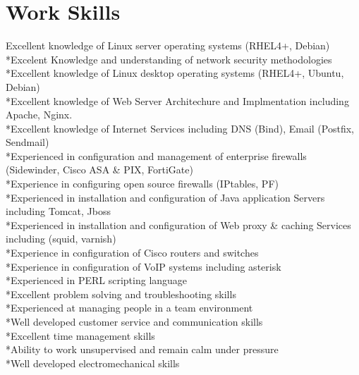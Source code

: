 \documentclass{resume} %
\begin{document}
\section{Work Skills}
Excellent knowledge of Linux server operating systems (RHEL4+, Debian)
\\*Excelent Knowledge and understanding of network security methodologies
\\*Excellent knowledge of Linux desktop operating systems (RHEL4+, Ubuntu, Debian)
\\*Excellent knowledge of Web Server Architechure and Implmentation including Apache, Nginx.
\\*Excellent knowledge of Internet Services including DNS (Bind), Email (Postfix, Sendmail)
\\*Experienced in configuration and management of enterprise firewalls (Sidewinder, Cisco ASA \& PIX, FortiGate)
\\*Experience in configuring open source firewalls (IPtables, PF)
\\*Experienced in installation and configuration of Java application Servers including Tomcat, Jboss
\\*Experienced in installation and configuration of Web proxy \& caching Services including (squid, varnish)
\\*Experience in configuration of Cisco routers and switches
\\*Experience in configuration of VoIP systems including asterisk
\\*Experienced in PERL scripting language
\\*Excellent problem solving and troubleshooting skills
\\*Experienced at managing people in a team environment
\\*Well developed customer service and communication skills
\\*Excellent time management skills
\\*Ability to work unsupervised and remain calm under pressure
\\*Well developed electromechanical skills
\end{document}
